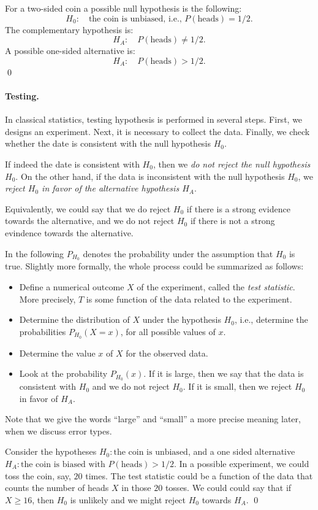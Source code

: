 \begin{example}
For a two-sided coin a possible null hypothesis is the following:
$$H_0: \quad\text{the coin is unbiased, i.e., $P(\text{heads}) = 1/2$.}$$
The complementary hypothesis is:
$$H_A: \quad\text{$P(\text{heads}) \neq 1/2$.}$$
A possible one-sided alternative is:
$$H_A: \quad\text{$P(\text{heads}) > 1/2$.}$$
\qed
\end{example}

\paragraph{Testing.}
In classical statistics, testing hypothesis is performed in several steps.
First, we designs an experiment.
Next, it is necessary to collect the data.
Finally, we check whether the date is consistent with the null hypothesis $H_0$.

If indeed the date is consistent with $H_0$, then we \emph{do not reject the null hypothesis $H_0$}.
On the other hand, if the data is inconsistent with the null hypothesis $H_0$, we \emph{reject $H_0$ in favor of the alternative hypothesis $H_A$}.

Equivalently, we could say that we do reject $H_0$ if there is a strong evidence towards the alternative, and we do not reject $H_0$ if there is not a strong evindence towards the alternative.

In the following $P_{H_0}$ denotes the probability under the assumption that $H_0$ is true.
Slightly more formally, the whole process could be summarized as follows:
\begin{itemize}
\item
Define a numerical outcome $X$ of the experiment, called the \emph{test statistic}.
More precisely, $T$ is some function of the data related to the experiment.
\item
Determine the distribution of $X$ under the hypothesis $H_0$, i.e., determine the probabilities $P_{H_0}(X=x)$, for all possible values of $x$.
\item
Determine the value $x$ of $X$ for the observed data.
\item
Look at the probability $P_{H_0}(x)$.
If it is large, then we say that the data is consistent with $H_0$ and we do not reject $H_0$.
If it is small, then we reject $H_0$ in favor of $H_A$.
\end{itemize}
Note that we give the words ``large'' and ``small'' a more precise meaning later, when we discuss error types.

\begin{example}
Consider the hypotheses $H_0: \text{the coin is unbiased}$, and a one sided alternative $H_A: \text{the coin is biased with $P(\text{heads}) > 1/2$}$.
In a possible experiment, we could toss the coin, say, $20$ times.
The test statistic could be a function of the data that counts the number of heads $X$ in those $20$ tosses.
We could could say that if $X \geq 16$, then $H_0$ is unlikely and we might reject $H_0$ towards $H_A$.
\qed
\end{example}

